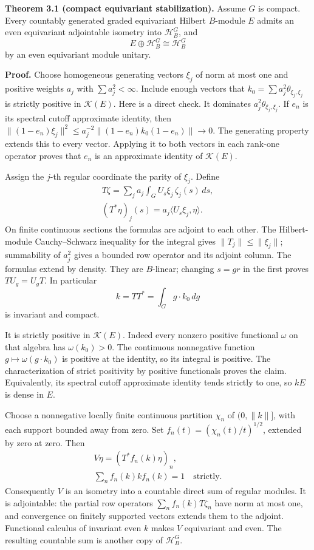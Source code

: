 \documentclass[
  11pt,
]{article}
\begin{document}
\textbf{Theorem 3.1 (compact equivariant stabilization).} Assume \(G\)
is compact. Every countably generated graded equivariant Hilbert
\(B\)-module \(E\) admits an even equivariant adjointable isometry into
\(\mathcal H_B^G\), and \[
E\oplus\mathcal H_B^G\cong\mathcal H_B^G
\tag{3.2}
\] by an even equivariant module unitary.

\textbf{Proof.} Choose homogeneous generating vectors \(\xi_j\) of norm
at most one and positive weights \(a_j\) with \(\sum a_j^2<\infty\).
Include enough vectors that \(k_0=\sum a_j^2\theta_{\xi_j,\xi_j}\) is
strictly positive in \(\mathcal K(E)\). Here is a direct check. It
dominates \(a_j^2\theta_{\xi_j,\xi_j}\). If \(e_n\) is its spectral
cutoff approximate identity, then
\(\|(1-e_n)\xi_j\|^2\leq a_j^{-2}\|(1-e_n)k_0(1-e_n)\|\to0\). The
generating property extends this to every vector. Applying it to both
vectors in each rank-one operator proves that \(e_n\) is an approximate
identity of \(\mathcal K(E)\).

Assign the \(j\)-th regular coordinate the parity of \(\xi_j\). Define
\[
\begin{gathered}
T\zeta=\sum_j a_j\int_G U_s\xi_j\,\zeta_j(s)\,ds,\\
(T^*\eta)_j(s)=a_j\langle U_s\xi_j,\eta\rangle.
\end{gathered}
\tag{3.3}
\] On finite continuous sections the formulas are adjoint to each other.
The Hilbert-module Cauchy--Schwarz inequality for the integral gives
\(\|T_j\|\leq\|\xi_j\|\); summability of \(a_j^2\) gives a bounded row
operator and its adjoint column. The formulas extend by density. They
are \(B\)-linear; changing \(s=gr\) in the first proves \(TU_g=U_gT\).
In particular \[
k=TT^*=\int_G g\cdot k_0\,dg
\tag{3.4}
\] is invariant and compact.

It is strictly positive in \(\mathcal K(E)\). Indeed every nonzero
positive functional \(\omega\) on that algebra has \(\omega(k_0)>0\).
The continuous nonnegative function \(g\mapsto\omega(g\cdot k_0)\) is
positive at the identity, so its integral is positive. The
characterization of strict positivity by positive functionals proves the
claim. Equivalently, its spectral cutoff approximate identity tends
strictly to one, so \(kE\) is dense in \(E\).

Choose a nonnegative locally finite continuous partition \(\chi_n\) of
\((0,\|k\|]\), with each support bounded away from zero. Set
\(f_n(t)=(\chi_n(t)/t)^{1/2}\), extended by zero at zero. Then \[
\begin{gathered}
V\eta=(T^*f_n(k)\eta)_n,\\
\sum_n f_n(k)k f_n(k)=1\quad\text{strictly}.
\end{gathered}
\tag{3.5}
\] Consequently \(V\) is an isometry into a countable direct sum of
regular modules. It is adjointable: the partial row operators
\(\sum_n f_n(k)T\zeta_n\) have norm at most one, and convergence on
finitely supported vectors extends them to the adjoint. Functional
calculus of invariant even \(k\) makes \(V\) equivariant and even. The
resulting countable sum is another copy of \(\mathcal H_B^G\).
\end{document}
